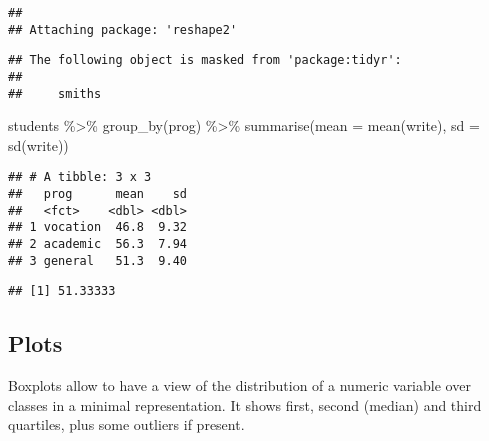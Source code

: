 \documentclass[
  oneside]{book}
\newenvironment{Shaded}{\begin{snugshade}}{\end{snugshade}}
\newcommand{\AttributeTok}[1]{\textcolor[rgb]{0.77,0.63,0.00}{#1}}
\newcommand{\CommentTok}[1]{\textcolor[rgb]{0.56,0.35,0.01}{\textit{#1}}}
\newcommand{\FunctionTok}[1]{\textcolor[rgb]{0.00,0.00,0.00}{#1}}
\newcommand{\NormalTok}[1]{#1}
\newcommand{\SpecialCharTok}[1]{\textcolor[rgb]{0.00,0.00,0.00}{#1}}
\newcommand{\StringTok}[1]{\textcolor[rgb]{0.31,0.60,0.02}{#1}}
\begin{document}
\begin{verbatim}
## 
## Attaching package: 'reshape2'
\end{verbatim}

\begin{verbatim}
## The following object is masked from 'package:tidyr':
## 
##     smiths
\end{verbatim}

\begin{Shaded}
\begin{Highlighting}[]
\NormalTok{students }\SpecialCharTok{\%\textgreater{}\%}
  \FunctionTok{group\_by}\NormalTok{(prog) }\SpecialCharTok{\%\textgreater{}\%}
  \FunctionTok{summarise}\NormalTok{(}\AttributeTok{mean =} \FunctionTok{mean}\NormalTok{(write), }\AttributeTok{sd =} \FunctionTok{sd}\NormalTok{(write))}
\end{Highlighting}
\end{Shaded}

\begin{verbatim}
## # A tibble: 3 x 3
##   prog      mean    sd
##   <fct>    <dbl> <dbl>
## 1 vocation  46.8  9.32
## 2 academic  56.3  7.94
## 3 general   51.3  9.40
\end{verbatim}

\begin{Shaded}
\end{Shaded}

\begin{verbatim}
## [1] 51.33333
\end{verbatim}

\hypertarget{plots}{%
\subsection{Plots}\label{plots}}

Boxplots allow to have a view of the distribution of a
numeric variable over classes in a minimal representation.
It shows first, second (median) and third quartiles, plus
some outliers if present.

\begin{Shaded}
\end{Shaded}
\end{document}
